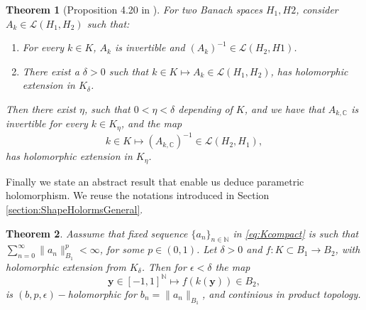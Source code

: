 \documentclass{article}
\newtheorem{theorem}{Theorem}[section]
\newcommand{\IC}{{\mathbb C}}
\newcommand{\IN}{{\mathbb N}}
\newcommand{\by}{\bm{y}}
\begin{document}
\begin{theorem}[Proposition 4.20 in \cite{Henriquez2021}]
\label{thrm:abtractinverse}For two Banach spaces $H_1,H2$,
consider $A_k \in \mathcal{L}(H_1,H_2)$ such that: 
\begin{enumerate}
\item 
For every $k \in K$, $A_k$ is invertible and $(A_k)^{-1} \in \mathcal{L}(H_2,H1)$. 
\item 
There exist a $\delta >0$ such that $k \in K \mapsto A_k \in \mathcal{L}(H_1,H_2)$, has holomorphic extension in $K_\delta$.
\end{enumerate}
Then there exist $\eta$, such that $0<\eta<\delta$ depending of $K$, and we have that $A_{k,\IC}$ is invertible for every $k \in K_\eta$, and the map 
$$k \in K \mapsto (A_{k,\IC})^{-1} \in \mathcal{L}(H_2,H_1),$$ has holomorphic extension in $K_\eta$.
\end{theorem} 
Finally we state an abstract result that enable us deduce parametric holomorphism. We reuse the notations introduced in Section \ref{section:ShapeHolormsGeneral}.
\begin{theorem}
Aassume that fixed sequence $\{a_n\}_{n \in \IN}$ in \eqref{eq:Kcompact} is  such that $\sum_{n=0}^\infty \| a_n \|^p_{B_1} <\infty$, for some $p \in (0,1)$. 
Let $\delta>0$ and $f : K \subset B_1 \rightarrow B_2$, with holomorphic extension from $K_\delta$. Then for $\epsilon < \delta$ the map 
$$ \by \in [-1,1]^{\IN} \mapsto f(k(\by)) \in B_2,$$
is $(b,p,\epsilon)-$holomorphic for $b_n = \|a_n\|_{B_1}$, and continious in product topology.
\end{theorem}
\end{document}
